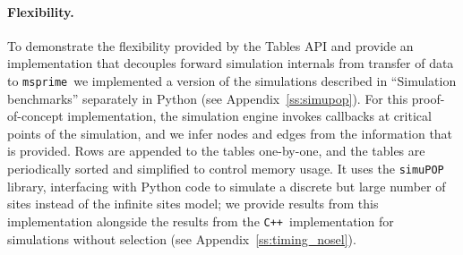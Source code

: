 \documentclass{article}
\newcommand{\simupop}{\texttt{simuPOP}}
\newcommand{\fwdpp}{\texttt{fwdpp}}
\newcommand{\cpp}{\texttt{C++}}
\newcommand{\msprime}{\texttt{msprime}}
\begin{document}
\paragraph{Flexibility.}
To demonstrate the flexibility provided by the Tables API and provide an
implementation that decouples forward simulation internals from transfer of data
to \msprime\, we implemented a version of the simulations described in
``Simulation benchmarks'' separately in Python (see Appendix~\ref{ss:simupop}).
For this proof-of-concept implementation, the simulation engine invokes
callbacks at critical points of the simulation, and we infer nodes and edges
from the information that is provided. Rows are appended to the tables
one-by-one, and the tables are periodically sorted and simplified to control
memory usage.
It uses the \simupop{} library, interfacing with Python code to simulate a
discrete but large number of sites instead of the infinite sites model; we
provide results from this implementation alongside the results from the \cpp\
implementation for simulations without selection  (see
Appendix~\ref{ss:timing_nosel}).

\end{document}
